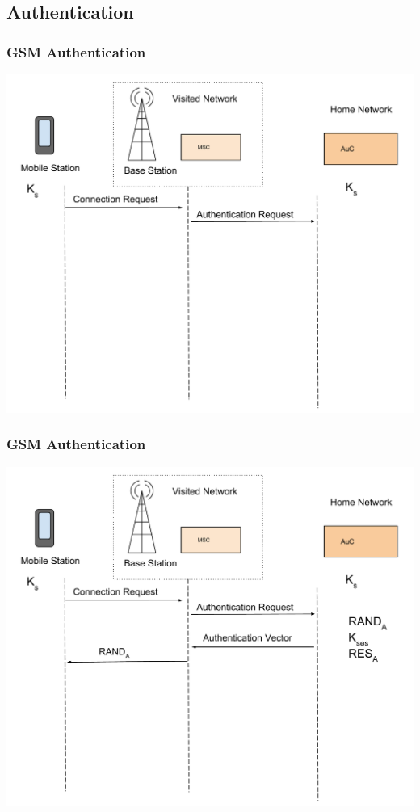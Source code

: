 \documentclass{beamer}
\begin{document}
\subsection{Authentication}

\begin{frame}
  \frametitle{GSM Authentication}
  \begin{center}
  \includegraphics[width=.9\textwidth, height=.85\textheight]{Images/GSMAuthentication1.pdf}

  \end{center} 
\end{frame}
\begin{frame}
  \frametitle{GSM Authentication}
  \begin{center}
  \includegraphics[width=.9\textwidth, height=.85\textheight]{Images/GSMAuthentication2.pdf}

  \end{center} 
\end{frame}
\end{document}
